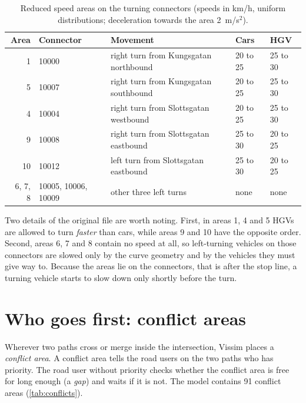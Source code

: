 \documentclass[11pt,a4paper]{article}
\begin{document}
\begin{table}[!htb]
\centering
\caption[Reduced speed areas]{Reduced speed areas on the turning connectors (speeds in km/h,
uniform distributions; deceleration towards the area 2~m/s$^2$).}
\label{tab:rsa}
\small
\begin{tabularx}{\textwidth}{rl>{\raggedright\arraybackslash}Xll}
\toprule
\textbf{Area} & \textbf{Connector} & \textbf{Movement} & \textbf{Cars} & \textbf{HGV}\\
\midrule
1  & 10000 & right turn from Kungsgatan northbound & 20 to 25 & 25 to 30\\
5  & 10007 & right turn from Kungsgatan southbound & 20 to 25 & 25 to 30\\
4  & 10004 & right turn from Slottsgatan westbound & 20 to 25 & 25 to 30\\
9  & 10008 & right turn from Slottsgatan eastbound & 25 to 30 & 20 to 25\\
10 & 10012 & left turn from Slottsgatan eastbound  & 25 to 30 & 20 to 25\\
6, 7, 8 & 10005, 10006, 10009 & other three left turns & none & none\\
\bottomrule
\end{tabularx}
\end{table}

Two details of the original file are worth noting. First, in areas 1, 4 and 5 HGVs are allowed to
turn \emph{faster} than cars, while areas 9 and 10 have the opposite order. Second, areas 6, 7 and
8 contain no speed at all, so left-turning vehicles on those connectors are slowed only by the
curve geometry and by the vehicles they must give way to. Because the areas lie on the connectors,
that is after the stop line, a turning vehicle starts to slow down only shortly before the turn.

\section{Who goes first: conflict areas}
\label{sec:priority}

Wherever two paths cross or merge inside the intersection, Vissim places a \emph{conflict area}.
A conflict area tells the road users on the two paths who has priority. The road user without
priority checks whether the conflict area is free for long enough (a \emph{gap}) and waits if it is
not. The model contains 91 conflict areas (\cref{tab:conflicts}).
\end{document}
